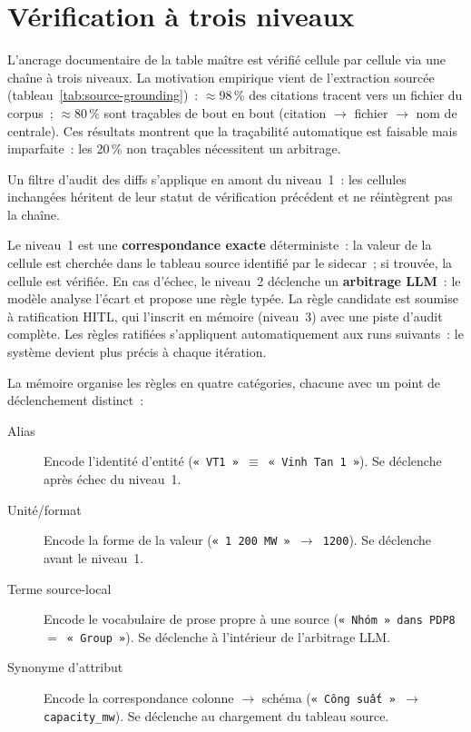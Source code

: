 \documentclass[a4paper,11pt]{report}
\begin{document}
\section{Vérification à trois niveaux}

L'ancrage documentaire de la table maître est vérifié cellule par cellule via une chaîne à trois niveaux. La motivation empirique vient de l'extraction sourcée (tableau~\ref{tab:source-grounding})~: $\approx$98\,\% des citations tracent vers un fichier du corpus~; $\approx$80\,\% sont traçables de bout en bout (citation $\to$ fichier $\to$ nom de centrale). Ces résultats montrent que la traçabilité automatique est faisable mais imparfaite~: les 20\,\% non traçables nécessitent un arbitrage.

Un filtre d'audit des diffs s'applique en amont du niveau~1~: les cellules inchangées héritent de leur statut de vérification précédent et ne réintègrent pas la chaîne.

Le niveau~1 est une \textbf{correspondance exacte} déterministe~: la valeur de la cellule est cherchée dans le tableau source identifié par le sidecar~; si trouvée, la cellule est vérifiée. En cas d'échec, le niveau~2 déclenche un \textbf{arbitrage LLM}~: le modèle analyse l'écart et propose une règle typée. La règle candidate est soumise à ratification HITL, qui l'inscrit en mémoire (niveau~3) avec une piste d'audit complète. Les règles ratifiées s'appliquent automatiquement aux runs suivants~: le système devient plus précis à chaque itération.

La mémoire organise les règles en quatre catégories, chacune avec un point de déclenchement distinct~:

\begin{description}
\item[Alias] Encode l'identité d'entité (\texttt{«~VT1~» $\equiv$ «~Vinh Tan 1~»}). Se déclenche après échec du niveau~1.
\item[Unité/format] Encode la forme de la valeur (\texttt{«~1\,200 MW~» $\to$ 1200}). Se déclenche avant le niveau~1.
\item[Terme source-local] Encode le vocabulaire de prose propre à une source (\texttt{«~Nhóm~» dans PDP8 $=$ «~Group~»}). Se déclenche à l'intérieur de l'arbitrage LLM.
\item[Synonyme d'attribut] Encode la correspondance colonne $\to$ schéma (\texttt{«~Công suất~» $\to$ \texttt{capacity\_mw}}). Se déclenche au chargement du tableau source.
\end{description}
\end{document}

